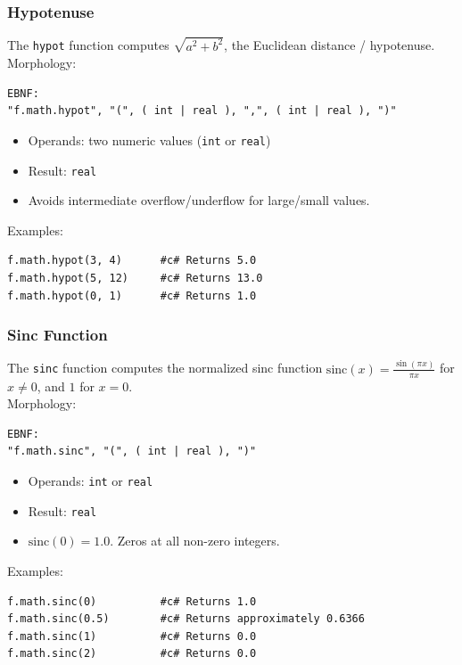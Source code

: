 \subsubsection{Hypotenuse}
The \texttt{hypot} function computes $\sqrt{a^2 + b^2}$, the Euclidean distance / hypotenuse.\\
Morphology:
\begin{verbatim}
EBNF:
"f.math.hypot", "(", ( int | real ), ",", ( int | real ), ")"
\end{verbatim}
\begin{itemize}
\item Operands: two numeric values (\texttt{int} or \texttt{real})
\item Result: \texttt{real}
\item Avoids intermediate overflow/underflow for large/small values.
\end{itemize}
Examples:
\begin{verbatim}
f.math.hypot(3, 4)      #c# Returns 5.0
f.math.hypot(5, 12)     #c# Returns 13.0
f.math.hypot(0, 1)      #c# Returns 1.0
\end{verbatim}

\subsubsection{Sinc Function}
The \texttt{sinc} function computes the normalized sinc function $\text{sinc}(x) = \frac{\sin(\pi x)}{\pi x}$ for $x \neq 0$, and $1$ for $x = 0$. \\
Morphology:
\begin{verbatim}
EBNF:
"f.math.sinc", "(", ( int | real ), ")"
\end{verbatim}
\begin{itemize}
\item Operands: \texttt{int} or \texttt{real}
\item Result: \texttt{real}
\item $\text{sinc}(0) = 1.0$. Zeros at all non-zero integers.
\end{itemize}
Examples:
\begin{verbatim}
f.math.sinc(0)          #c# Returns 1.0
f.math.sinc(0.5)        #c# Returns approximately 0.6366
f.math.sinc(1)          #c# Returns 0.0
f.math.sinc(2)          #c# Returns 0.0
\end{verbatim}

